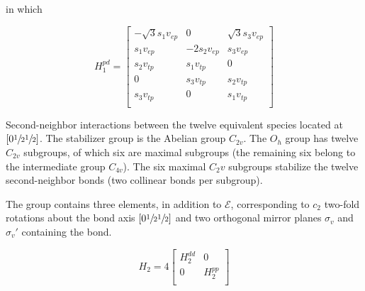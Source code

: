 \documentclass[preprint,showpacs,preprintnumbers,superscriptaddress,prb,floatfix,aps]{revtex4-1}
\newcommand*{\id}{\mathcal{E}}
\begin{document}
in which 

\begin{equation}
H_1^{pd} = 
\begin{bmatrix}
-\sqrt{3} s_1 v_{ep} & 0            & \sqrt{3} s_3 v_{ep}  \\ %
 s_1 v_{ep}          &-2 s_2 v_{ep} &  s_3 v_{ep}          \\ %
 s_2 v_{tp}          &  s_1 v_{tp}  & 0                    \\
0                    &  s_3 v_{tp}  &  s_2 v_{tp}          \\
 s_3 v_{tp}          & 0            &  s_1 v_{tp}          \\
\end{bmatrix}
\end{equation}

Second-neighbor interactions between the twelve equivalent species located at $\left[0\sfrac{1}{2}\sfrac{1}{2}\right]$. The stabilizer group is the Abelian group $C_{2v}$. The $O_h$ group has twelve $C_{2v}$ subgroups, of which six are maximal subgroups (the remaining six belong to the intermediate group $C_{4v}$). \cite{wadhawan_introduction_2000} The six maximal $C_2v$ subgroups stabilize the twelve second-neighbor bonds (two collinear bonds per subgroup). 

The group contains three elements, in addition to $\id$, corresponding to $c_2$ two-fold rotations about the bond axis $\left[0\sfrac{1}{2}\sfrac{1}{2}\right]$ and two orthogonal mirror planes $\sigma_v$ and $\sigma_v'$ containing the bond.


\begin{equation}
H_2 = 4
\begin{bmatrix}
H_2^{dd} & 0 \\
 0 & H_2^{pp} \\
\end{bmatrix}
\end{equation}
\end{document}
